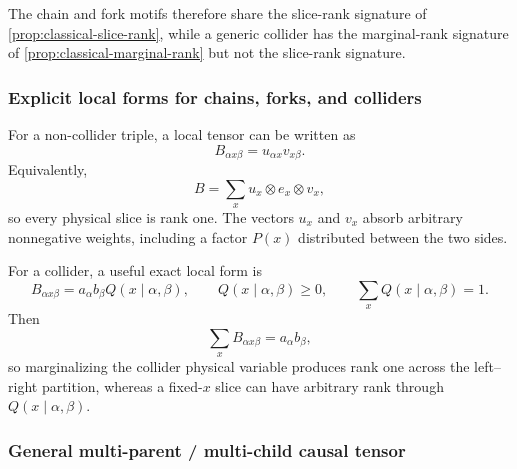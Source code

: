 \documentclass[11pt]{article}
\theoremstyle{remark}
\begin{document}
The chain and fork motifs therefore share the slice-rank signature of \cref{prop:classical-slice-rank}, while a generic collider has the marginal-rank signature of \cref{prop:classical-marginal-rank} but not the slice-rank signature.

\subsubsection{Explicit local forms for chains, forks, and colliders}

For a non-collider triple, a local tensor can be written as
\begin{equation}
B_{\alpha x\beta}=u_{\alpha x}v_{x\beta}.
\label{eq:classical-chain-form}
\end{equation}
Equivalently,
\begin{equation}
B=\sum_x u_x\otimes e_x\otimes v_x,
\end{equation}
so every physical slice is rank one. The vectors $u_x$ and $v_x$ absorb arbitrary nonnegative weights, including a factor $P(x)$ distributed between the two sides.

For a collider, a useful exact local form is
\begin{equation}
B_{\alpha x\beta}=a_\alpha b_\beta Q(x\mid \alpha,\beta),
\qquad
Q(x\mid\alpha,\beta)\ge0,
\qquad
\sum_xQ(x\mid\alpha,\beta)=1.
\label{eq:classical-collider-form}
\end{equation}
Then
\begin{equation}
\sum_xB_{\alpha x\beta}=a_\alpha b_\beta,
\end{equation}
so marginalizing the collider physical variable produces rank one across the left--right partition, whereas a fixed-$x$ slice can have arbitrary rank through $Q(x\mid\alpha,\beta)$.

\subsubsection{General multi-parent / multi-child causal tensor}
\label{sec:classical-general-node}
\end{document}

